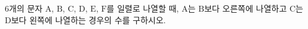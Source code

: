 6개의 문자 $\mathrm{A}$, $\mathrm{B}$, $\mathrm{C}$, $\mathrm{D}$, $\mathrm{E}$, $\mathrm{F}$를 일렬로 나열할 때, $\mathrm{A}$는 $\mathrm{B}$보다 오른쪽에 나열하고 $\mathrm{C}$는 $\mathrm{D}$보다 왼쪽에 나열하는 경우의 수를 구하시오.
